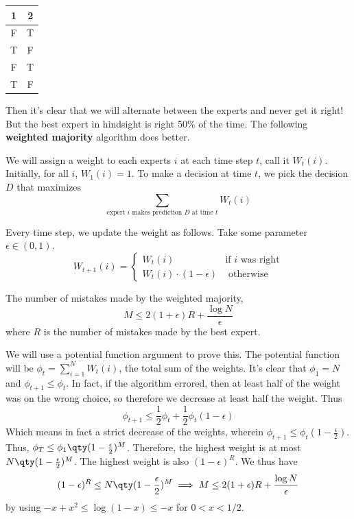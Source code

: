 \begin{center}
\begin{tabular}{c | c}
    1 & 2 \\ \hline
    F & T \\
    T & F \\
    F & T \\
    T & F
\end{tabular}
\end{center}

Then it's clear that we will alternate between the experts and never get it right!
But the best expert in hindsight is right 50\% of the time. The following \textbf{weighted majority} 
algorithm does better.

\begin{algothm}
    We will assign a weight to each experts $i$ at each time step $t$, call it $W_t(i)$.
    Initially, for all $i$, $W_1(i) = 1$. To make a decision at time $t$, we
    pick the decision $D$ that maximizes 
    \[ \sum_{\text{expert } i \text{ makes prediction } D \text{ at time } t} W_t(i) \]

    Every time step, we update the weight as follows. Take some parameter $\epsilon \in (0, 1)$.
    \[ W_{t + 1}(i) = \begin{cases}
        W_t(i) & \text{if } i \text{ was right} \\
        W_t(i) \cdot (1-\epsilon) & \text{ otherwise}
    \end{cases} \]
\end{algothm}

\begin{theorem}
    The number of mistakes made by the weighted majority,
    \[ M \le 2 (1 + \epsilon) R + \frac{\log N}{\epsilon} \]
    where $R$ is the number of mistakes made by the best expert.
    \begin{proof*}
        We will use a potential function argument to prove this.
        The potential function will be $\phi_t = \sum_{i = 1}^{N} W_t(i)$,
        the total sum of the weights. It's clear that $\phi_1 = N$ and $\phi_{t + 1} \le \phi_t$.
        In fact, if the algorithm errored, then at least half of the weight was on the wrong choice, so therefore
        we decrease at least half the weight. Thus
        \[ \phi_{t + 1} \le \frac{1}{2} \phi_t + \frac{1}{2} \phi_t (1 - \epsilon) \]
        Which means in fact a strict decrease of the weights, wherein $\phi_{t + 1} \le \phi_t\left(1 - \frac{\epsilon}{2}\right)$.
        Thus, $\phi_T \le \phi_1 \qty(1 - \frac{\epsilon}{2})^{M}$. Therefore, the highest weight
        is at most $N \qty(1 - \frac{\epsilon}{2})^{M}$.
        The highest weight is also $(1-\epsilon)^R$. We thus have
        \[(1-\epsilon)^R \le N \qty(1 - \frac{\epsilon}{2})^{M} \implies M \le  2 (1 + \epsilon) R + \frac{\log N}{\epsilon} \]
        by using $-x + x^2 \le \log(1 - x) \le - x$ for $0 < x < 1/2$.
    \end{proof*}
\end{theorem}

